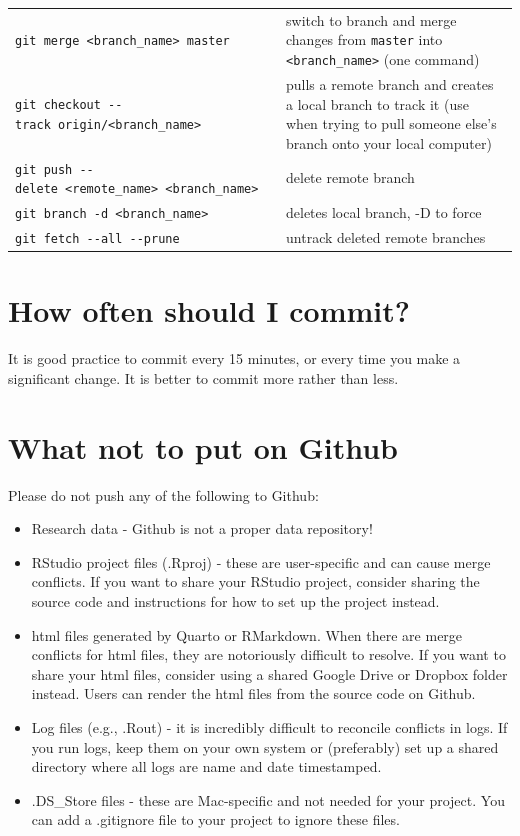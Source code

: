 \documentclass[
]{book}
\providecommand{\tightlist}{%
  \setlength{\itemsep}{0pt}\setlength{\parskip}{0pt}}
\begin{document}
{\begin{longtable}[]{@{}
  >{\raggedright\arraybackslash}p{}
  >{\raggedright\arraybackslash}p{}@{}}
\texttt{git\ merge\ \textless{}branch\_name\textgreater{}\ master} & switch to branch and merge changes from \texttt{master} into \texttt{\textless{}branch\_name\textgreater{}} (one command) \\
\texttt{git\ checkout\ -\/-track\ origin/\textless{}branch\_name\textgreater{}} & pulls a remote branch and creates a local branch to track it (use when trying to pull someone else's branch onto your local computer) \\
\texttt{git\ push\ -\/-delete\ \textless{}remote\_name\textgreater{}\ \textless{}branch\_name\textgreater{}} & delete remote branch \\
\texttt{git\ branch\ -d\ \textless{}branch\_name\textgreater{}} & deletes local branch, -D to force \\
\texttt{git\ fetch\ -\/-all\ -\/-prune} & untrack deleted remote branches \\
\end{longtable}
}

\section{How often should I commit?}\label{how-often-should-i-commit}

It is good practice to commit every 15 minutes, or every time you make a significant change. It is better to commit more rather than less.

\section{What not to put on Github}\label{what-not-to-put-on-github}

Please do not push any of the following to Github:

\begin{itemize}
\tightlist
\item
  Research data - Github is not a proper data repository!
\item
  RStudio project files (.Rproj) - these are user-specific and can cause merge conflicts. If you want to share your RStudio project, consider sharing the source code and instructions for how to set up the project instead.
\item
  html files generated by Quarto or RMarkdown. When there are merge conflicts for html files, they are notoriously difficult to resolve. If you want to share your html files, consider using a shared Google Drive or Dropbox folder instead. Users can render the html files from the source code on Github.
\item
  Log files (e.g., .Rout) - it is incredibly difficult to reconcile conflicts in logs. If you run logs, keep them on your own system or (preferably) set up a shared directory where all logs are name and date timestamped.
\item
  .DS\_Store files - these are Mac-specific and not needed for your project. You can add a .gitignore file to your project to ignore these files.
\end{itemize}
\end{document}
